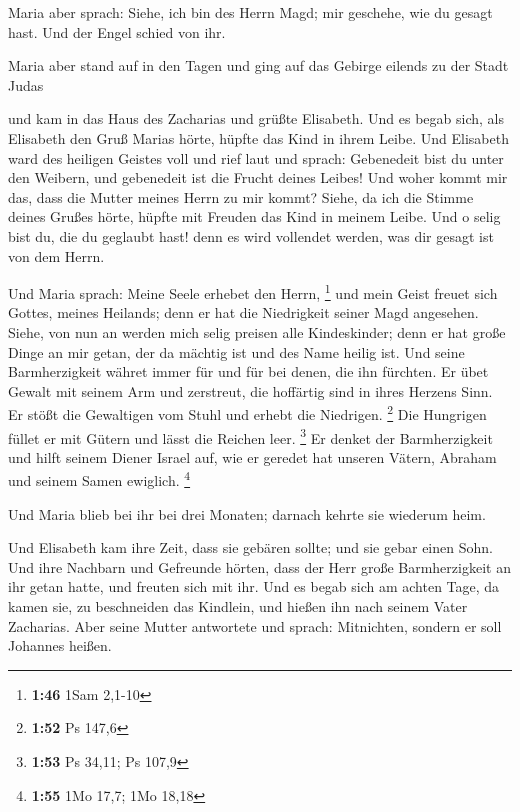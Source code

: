  Maria aber sprach: Siehe, ich bin des Herrn Magd; mir
geschehe, wie du gesagt hast. Und der Engel schied von ihr.

 Maria aber stand auf in den Tagen und ging auf das Gebirge
eilends zu der Stadt Judas

 und kam in das Haus des Zacharias und grüßte Elisabeth.
 Und es begab sich, als Elisabeth den Gruß Marias hörte,
hüpfte das Kind in ihrem Leibe. Und Elisabeth ward des heiligen Geistes
voll  und rief laut und sprach: Gebenedeit bist du unter
den Weibern, und gebenedeit ist die Frucht deines Leibes! 
Und woher kommt mir das, dass die Mutter meines Herrn zu mir kommt?
 Siehe, da ich die Stimme deines Grußes hörte, hüpfte mit
Freuden das Kind in meinem Leibe.  Und o selig bist du, die
du geglaubt hast! denn es wird vollendet werden, was dir gesagt ist von
dem Herrn.

 Und Maria sprach: Meine Seele erhebet den Herrn,
\footnote{\textbf{1:46} 1Sam 2,1-10}  und mein Geist freuet
sich Gottes, meines Heilands;  denn er hat die Niedrigkeit
seiner Magd angesehen. Siehe, von nun an werden mich selig preisen alle
Kindeskinder;  denn er hat große Dinge an mir getan, der da
mächtig ist und des Name heilig ist.  Und seine
Barmherzigkeit währet immer für und für bei denen, die ihn fürchten.
 Er übet Gewalt mit seinem Arm und zerstreut, die hoffärtig
sind in ihres Herzens Sinn.  Er stößt die Gewaltigen vom
Stuhl und erhebt die Niedrigen. \footnote{\textbf{1:52} Ps 147,6}
 Die Hungrigen füllet er mit Gütern und lässt die Reichen
leer. \footnote{\textbf{1:53} Ps 34,11; Ps 107,9}  Er
denket der Barmherzigkeit und hilft seinem Diener Israel auf,
 wie er geredet hat unseren Vätern, Abraham und seinem
Samen ewiglich. \footnote{\textbf{1:55} 1Mo 17,7; 1Mo 18,18}

 Und Maria blieb bei ihr bei drei Monaten; darnach kehrte
sie wiederum heim.

 Und Elisabeth kam ihre Zeit, dass sie gebären sollte; und
sie gebar einen Sohn.  Und ihre Nachbarn und Gefreunde
hörten, dass der Herr große Barmherzigkeit an ihr getan hatte, und
freuten sich mit ihr.  Und es begab sich am achten Tage, da
kamen sie, zu beschneiden das Kindlein, und hießen ihn nach seinem Vater
Zacharias.  Aber seine Mutter antwortete und sprach:
Mitnichten, sondern er soll Johannes heißen.

